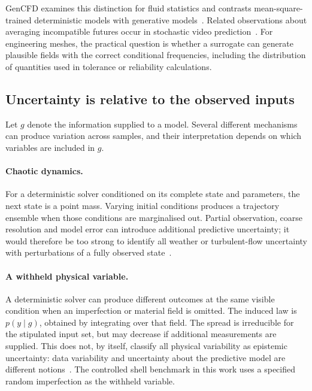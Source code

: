 GenCFD examines this distinction for fluid statistics and contrasts
mean-square-trained deterministic models with generative
models~\cite{molinaro2024gencfd}. Related observations about averaging
incompatible futures occur in stochastic video
prediction~\cite{babaeizadeh2018sv2p,denton2018svglp,lee2018savp}.
For engineering meshes, the practical question is whether a surrogate can
generate plausible fields with the correct conditional frequencies, including
the distribution of quantities used in tolerance or reliability calculations.

\subsection{Uncertainty is relative to the observed inputs}
\label{sec:intro:mechanisms}

Let $g$ denote the information supplied to a model. Several different
mechanisms can produce variation across samples, and their interpretation
depends on which variables are included in $g$.

\paragraph{Chaotic dynamics.}
For a deterministic solver conditioned on its complete state and parameters,
the next state is a point mass. Varying initial conditions produces a
trajectory ensemble when those conditions are marginalised out. Partial
observation, coarse resolution and model error can introduce additional
predictive uncertainty; it would therefore be too strong to identify all
weather or turbulent-flow uncertainty with perturbations of a fully observed
state~\cite{price2025gencast,kohl2026acdm}.

\paragraph{A withheld physical variable.}
A deterministic solver can produce different outcomes at the same visible
condition when an imperfection or material field is omitted. The induced law
is $p(y\mid g)$, obtained by integrating over that field. The spread is
irreducible for the stipulated input set, but may decrease if additional
measurements are supplied. This does not, by itself, classify all physical
variability as epistemic uncertainty: data variability and uncertainty about
the predictive model are different notions~\cite{huellermeier2021aleatoric}.
The controlled shell benchmark in this work uses a specified random
imperfection as the withheld variable.

